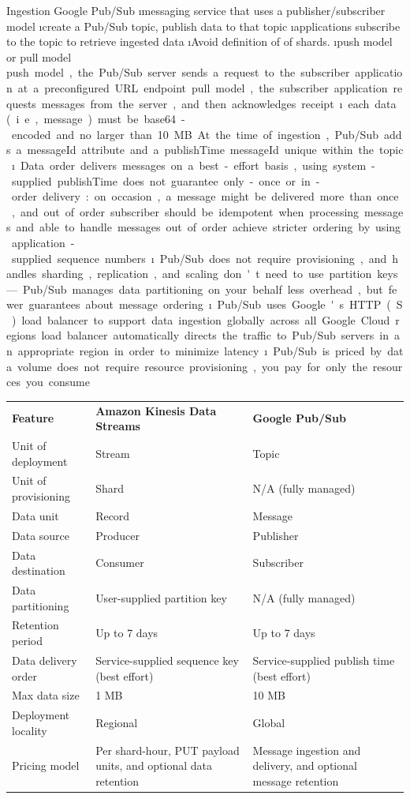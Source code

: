 \begin{frame}[allowframebreaks]{Ingestion}
\framebreak
Google Pub/Sub
\i messaging service that uses a publisher/subscriber model
\i create a Pub/Sub topic, publish data to that topic
\i applications subscribe to the topic to retrieve ingested data
\i Avoid definition of of shards.
\i push model or pull model
\si push model, the Pub/Sub server sends a request to the subscriber application at a preconfigured URL endpoint
\si pull model, the subscriber application requests messages from the server, and then acknowledges receipt
\i each data (i.e., message) must be base64-encoded and no larger than 10 MB
\si At the time of ingestion, Pub/Sub adds a messageId attribute and a publishTime
\si messageId unique within the topic
\i Data order
\si delivers messages on a best-effort basis, using system-supplied publishTime
\si does not guarantee only-once or in-order delivery: on occasion, a message might be delivered more than once, and out of order
\si subscriber should be idempotent when processing messages and able to handle messages out of order
\si achieve stricter ordering by using application-supplied sequence numbers
\i Pub/Sub does not require provisioning, and handles sharding, replication, and scaling
\si don't need to use partition keys—Pub/Sub manages data partitioning on your behalf
\si less overhead, but fewer guarantees about message ordering.
\i Pub/Sub uses Google's HTTP(S) load balancer to support data ingestion globally across all Google Cloud regions
\si load balancer automatically directs the traffic to Pub/Sub servers in an appropriate region in order to minimize latency.
\i Pub/Sub is priced by data volume
\si does not require resource provisioning, you pay for only the resources you consume

\framebreak
\begin{table}
\centering
\footnotesize
\begin{tabular}{lp{5cm}p{5cm}}
\textbf{Feature} & \textbf{Amazon Kinesis Data Streams} & \textbf{Google Pub/Sub} \\
Unit of deployment & Stream & Topic \\
Unit of provisioning & Shard & N/A (fully managed) \\
Data unit & Record & Message \\
Data source & Producer & Publisher \\
Data destination & Consumer & Subscriber \\
Data partitioning & User-supplied partition key & N/A (fully managed) \\
Retention period & Up to 7 days & Up to 7 days \\
Data delivery order & Service-supplied sequence key (best effort) & Service-supplied publish time (best effort) \\
Max data size & 1 MB  & 10 MB \\
Deployment locality & Regional & Global \\
Pricing model & Per shard-hour, PUT payload units, and optional data retention & Message ingestion and delivery, and optional message retention \\
\end{tabular}%
\end{table}%
\end{frame}

